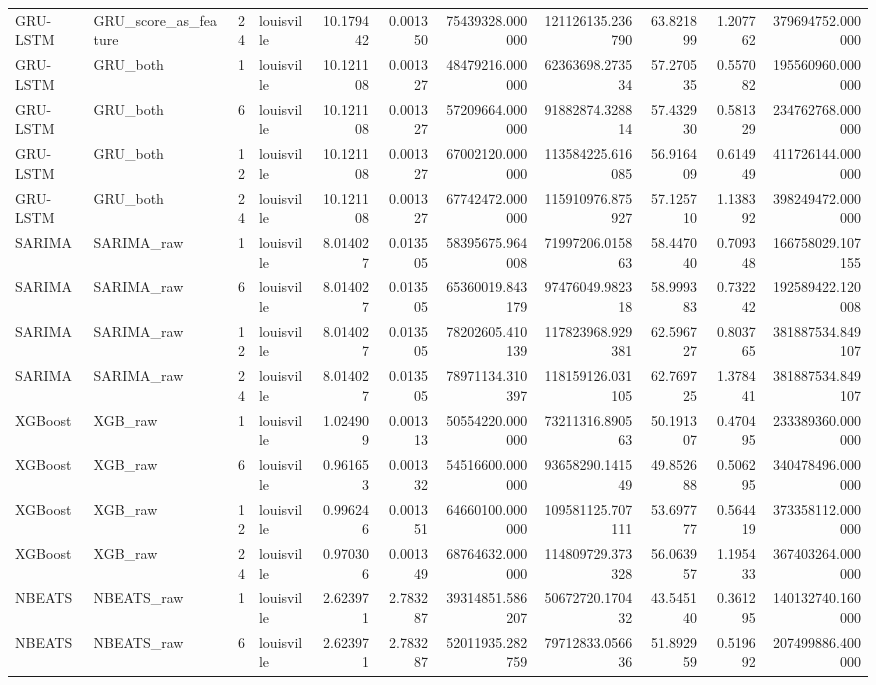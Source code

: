 \begin{longtable}{llrlrrrrrrr}
GRU-LSTM & GRU\_score\_as\_feature & 24 & louisville & 10.179442 & 0.001350 & 75439328.000000 & 121126135.236790 & 63.821899 & 1.207762 & 379694752.000000 \\
GRU-LSTM & GRU\_both & 1 & louisville & 10.121108 & 0.001327 & 48479216.000000 & 62363698.273534 & 57.270535 & 0.557082 & 195560960.000000 \\
GRU-LSTM & GRU\_both & 6 & louisville & 10.121108 & 0.001327 & 57209664.000000 & 91882874.328814 & 57.432930 & 0.581329 & 234762768.000000 \\
GRU-LSTM & GRU\_both & 12 & louisville & 10.121108 & 0.001327 & 67002120.000000 & 113584225.616085 & 56.916409 & 0.614949 & 411726144.000000 \\
GRU-LSTM & GRU\_both & 24 & louisville & 10.121108 & 0.001327 & 67742472.000000 & 115910976.875927 & 57.125710 & 1.138392 & 398249472.000000 \\
SARIMA & SARIMA\_raw & 1 & louisville & 8.014027 & 0.013505 & 58395675.964008 & 71997206.015863 & 58.447040 & 0.709348 & 166758029.107155 \\
SARIMA & SARIMA\_raw & 6 & louisville & 8.014027 & 0.013505 & 65360019.843179 & 97476049.982318 & 58.999383 & 0.732242 & 192589422.120008 \\
SARIMA & SARIMA\_raw & 12 & louisville & 8.014027 & 0.013505 & 78202605.410139 & 117823968.929381 & 62.596727 & 0.803765 & 381887534.849107 \\
SARIMA & SARIMA\_raw & 24 & louisville & 8.014027 & 0.013505 & 78971134.310397 & 118159126.031105 & 62.769725 & 1.378441 & 381887534.849107 \\
XGBoost & XGB\_raw & 1 & louisville & 1.024909 & 0.001313 & 50554220.000000 & 73211316.890563 & 50.191307 & 0.470495 & 233389360.000000 \\
XGBoost & XGB\_raw & 6 & louisville & 0.961653 & 0.001332 & 54516600.000000 & 93658290.141549 & 49.852688 & 0.506295 & 340478496.000000 \\
XGBoost & XGB\_raw & 12 & louisville & 0.996246 & 0.001351 & 64660100.000000 & 109581125.707111 & 53.697777 & 0.564419 & 373358112.000000 \\
XGBoost & XGB\_raw & 24 & louisville & 0.970306 & 0.001349 & 68764632.000000 & 114809729.373328 & 56.063957 & 1.195433 & 367403264.000000 \\
NBEATS & NBEATS\_raw & 1 & louisville & 2.623971 & 2.783287 & 39314851.586207 & 50672720.170432 & 43.545140 & 0.361295 & 140132740.160000 \\
NBEATS & NBEATS\_raw & 6 & louisville & 2.623971 & 2.783287 & 52011935.282759 & 79712833.056636 & 51.892959 & 0.519692 & 207499886.400000 \\

\end{longtable}
